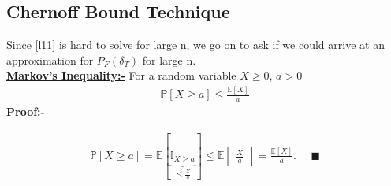\documentclass[12pt]{report}
\begin{document}
\subsection{Chernoff Bound Technique}
Since \eqref{l11} is hard to solve for large n, we go on to ask if we could arrive at an approximation for $P_F(\delta_T)$ for large n.\\

\noindent \textbf{\underline{Markov's Inequality:-}} For a random variable $X\geqslant0$, $ a>0$ \\
\begin{equation}
\begin{aligned}
\mathbb{P}[X\geqslant a] \leqslant \frac{\mathbb{E}[X]}{a} 
\end{aligned}
\end{equation}
\textbf{\underline{Proof:-}}

\begin{equation}
\begin{aligned}
\mathbb{P}[X\geqslant a] = \mathbb{E}[\underbrace{\mathbb{I}_{X\geqslant a}}_{\le \frac{X}{a}}]
\leqslant \mathbb{E}
\begin{bmatrix}
\frac{X}{a}
\end{bmatrix}
=\frac{\mathbb{E}[X]}{a}. \ \ \ \ \ \ \blacksquare
\end{aligned}
\end{equation}
 
\end{document}
